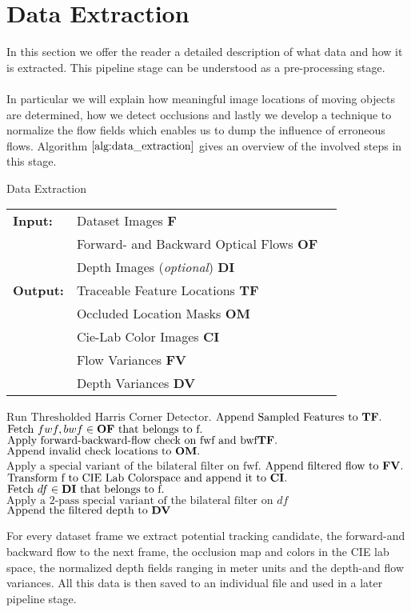 \section{Data Extraction}
\label{sec:data_extraction}
In this section we offer the reader a detailed description of what data and how it is extracted. This pipeline stage can be understood as a pre-processing stage. \\ \\
In particular we will explain how meaningful image locations of moving objects are determined, how we detect occlusions and lastly we develop a technique to normalize the flow fields which enables us to dump the influence of erroneous flows. Algorithm $\ref{alg:data_extraction}$ gives an overview of the involved steps in this stage.
\begin{algorithm}[H]
\caption{Data Extraction}
\begin{table}[H]
  \begin{tabular}{@{}lll@{}}
    \textbf{Input:} & Dataset Images \bf{F} \\
		& Forward- and Backward Optical Flows \bf{OF} \\
 		& Depth Images (\emph{optional}) \bf{DI} \\
    \textbf{Output:} & Traceable Feature Locations \bf{TF} \\
    & Occluded Location Masks \bf{OM}\\
    & Cie-Lab Color Images \bf{CI} \\
    & Flow Variances \bf{FV} \\
    & Depth Variances \bf{DV} \\
    
  \end{tabular} 
\end{table}
\setlength{\fboxrule}{0pt} 
\begin{boxedminipage}{1.0\textwidth}
  \begin{algorithmic}[1]
        \State $\text{Run Thresholded Harris Corner Detector}.$
		\State $\text{Append Sampled Features to } \bf{TF}.$
		\State $\text{Fetch } fwf,bwf \in \bf{OF} \text{ that belongs to f}.$
		\State $\text{Apply forward-backward-flow check on fwf and bwf} \bf{TF}.$
		\State $\text{Append invalid check locations to } \bf{OM}.$
		\State $\text{Apply a special variant of the bilateral filter on fwf}.$
		\State $\text{Append filtered flow to } \bf{FV}.$
		\State $\text{Transform f to CIE Lab Colorspace and append it to } \bf{CI}.$
		\State $\text{Fetch } df \in \bf{DI} \text{ that belongs to f}.$
		\State $\text{Apply a 2-pass special variant of the bilateral filter on } df$
		\State $\text{Append the filtered depth to } \bf{DV}$
      \EndFor
  \end{algorithmic}
  \end{boxedminipage}
  \vskip1.5pt
\label{alg:data_extraction}
\end{algorithm}
For every dataset frame we extract potential tracking candidate, the forward-and backward flow to the next frame, the occlusion map and colors in the CIE lab space, the normalized depth fields ranging in meter units and the depth-and flow variances. All this data is then saved to an individual file and used in a later pipeline stage.
